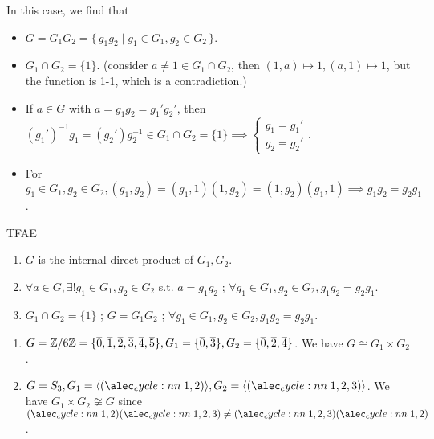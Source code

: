 \begin{remark}
  In this case, we find that
  \begin{itemize}
    \item $G = G_1 G_2 = \{\, g_1 g_2 \mid g_1 \in G_1, g_2 \in G_2 \,\}$.
    \item $G_1 \cap G_2 = \{ 1 \}$. (consider $a \ne 1 \in G_1 \cap G_2$, then
      $(1, a) \mapsto 1, (a, 1) \mapsto 1$, but the function is 1-1, which
      is a contradiction.)
    \item If $a \in G$ with $a = g_1g_2 = g_1'g_2'$, then
      $(g_1')^{-1}g_1 = (g_2')g_2^{-1} \in G_1 \cap G_2 = \{ 1 \} \implies
      \begin{cases} g_1 = g_1' \\ g_2 = g_2'\end{cases}$.
    \item For $g_1 \in G_1, g_2 \in G_2, (g_1, g_2) = (g_1, 1)(1, g_2) =
      (1, g_2)(g_1, 1) \implies g_1g_2 = g_2g_1$.
  \end{itemize}
\end{remark}

\begin{exercise} TFAE
  \begin{enumerate}
    \item $G$ is the internal direct product of $G_1, G_2$.
    \item $\forall a \in G, \exists! g_1 \in G_1, g_2 \in G_2$ s.t.
      $a = g_1g_2$ ; $\forall g_1 \in G_1, g_2 \in G_2, g_1g_2 = g_2g_1$.
    \item $G_1 \cap G_2 = \{ 1 \}$ ; $G = G_1G_2$ ;
      $\forall g_1 \in G_1, g_2 \in G_2, g_1g_2 = g_2g_1$.
  \end{enumerate}
\end{exercise}

\begin{example} \mbox{}
  \begin{enumerate}
    \item $G = \mathbb{Z}/6\mathbb{Z} = \{ \overline{0}, \overline{1}, \overline{2}, \overline{3}, \overline{4}, \overline{5} \},
      G_1 = \{ \overline{0}, \overline{3} \}, G_2 = \{ \overline{0}, \overline{2}, \overline{4} \}$.
      We have $G \cong G_1 \times G_2$.
    \item $G = S_3, G_1 = \langle \cycle{1,2} \rangle, G_2 = \langle \cycle{1,2,3} \rangle$.
      We have $G_1 \times G_2 \not\cong G$ since $\cycle{1,2}\cycle{1,2,3} \ne
      \cycle{1,2,3}\cycle{1,2}$.
  \end{enumerate}
\end{example}

